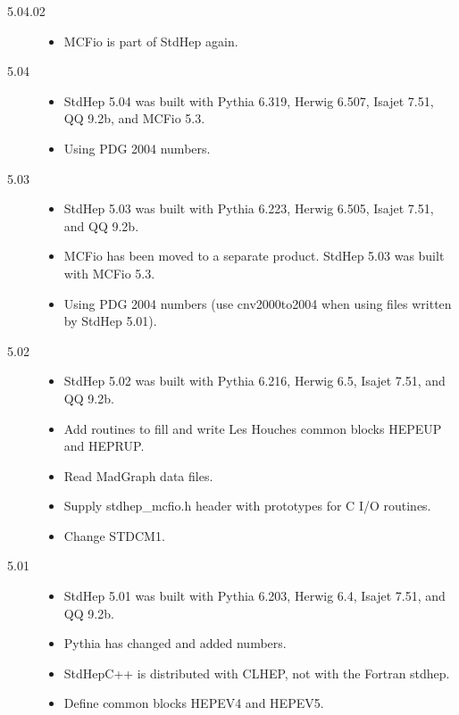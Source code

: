 \begin{description}
\item[5.04.02]
\begin{itemize}
\item MCFio is part of StdHep again.  
\end{itemize}

\item[5.04]

\begin{itemize}
\item StdHep 5.04 was built with Pythia 6.319, Herwig 6.507, 
      Isajet 7.51, QQ 9.2b, and MCFio 5.3.
\item Using PDG 2004 numbers.
\end{itemize}

\item[5.03]

\begin{itemize}
\item StdHep 5.03 was built with Pythia 6.223, Herwig 6.505, Isajet 7.51, and QQ 9.2b.
\item MCFio has been moved to a separate product.  
      StdHep 5.03 was built with MCFio 5.3.
\item Using PDG 2004 numbers  
      (use cnv2000to2004 when using files written by StdHep 5.01).
\end{itemize}

\item[5.02]

\begin{itemize}
\item StdHep 5.02 was built with Pythia 6.216, Herwig 6.5, Isajet 7.51, and QQ 9.2b.
\item Add routines to fill and write Les Houches common blocks HEPEUP and HEPRUP.
\item Read MadGraph data files.
\item Supply stdhep\_mcfio.h header with prototypes for C I/O routines.
\item Change STDCM1.
\end{itemize}

\item[5.01]

\begin{itemize}
\item StdHep 5.01 was built with Pythia 6.203, Herwig 6.4, Isajet 7.51, and QQ 9.2b.
\item Pythia has changed and added numbers.
\item StdHepC++ is distributed with CLHEP, not with the Fortran stdhep.
\item Define common blocks HEPEV4 and HEPEV5.
\end{itemize}



\end{description}
